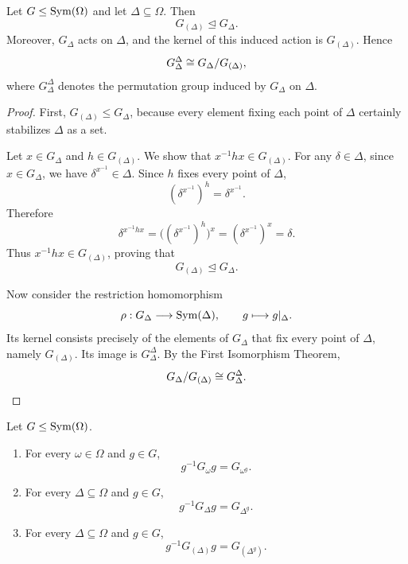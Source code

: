 \begin{proposition}
Let \(G\leq \operatorname{Sym}(\Omega)\) and let \(\Delta\subseteq \Omega\). Then
\[
    G_{(\Delta)}\unlhd G_\Delta.
\]
Moreover, \(G_\Delta\) acts on \(\Delta\), and the kernel of this induced action is \(G_{(\Delta)}\). Hence
\[
    G_\Delta^\Delta \cong G_\Delta/G_{(\Delta)},
\]
where \(G_\Delta^\Delta\) denotes the permutation group induced by \(G_\Delta\) on \(\Delta\).
\end{proposition}

\begin{proof}
First, \(G_{(\Delta)}\leq G_\Delta\), because every element fixing each point of \(\Delta\) certainly stabilizes \(\Delta\) as a set.

Let \(x\in G_\Delta\) and \(h\in G_{(\Delta)}\). We show that \(x^{-1}hx\in G_{(\Delta)}\). For any \(\delta\in \Delta\), since \(x\in G_\Delta\), we have \(\delta^{x^{-1}}\in \Delta\). Since \(h\) fixes every point of \(\Delta\),
\[
    (\delta^{x^{-1}})^h=\delta^{x^{-1}}.
\]
Therefore
\[
    \delta^{x^{-1}hx}
    =
    \bigl((\delta^{x^{-1}})^h\bigr)^x
    =
    (\delta^{x^{-1}})^x
    =
    \delta.
\]
Thus \(x^{-1}hx\in G_{(\Delta)}\), proving that
\[
    G_{(\Delta)}\unlhd G_\Delta.
\]

Now consider the restriction homomorphism
\[
    \rho:G_\Delta\longrightarrow \operatorname{Sym}(\Delta),
    \qquad
    g\longmapsto g|_\Delta.
\]
Its kernel consists precisely of the elements of \(G_\Delta\) that fix every point of \(\Delta\), namely \(G_{(\Delta)}\). Its image is \(G_\Delta^\Delta\). By the First Isomorphism Theorem,
\[
    G_\Delta/G_{(\Delta)}\cong G_\Delta^\Delta.
\]
\end{proof}

\begin{proposition}
Let \(G\leq \operatorname{Sym}(\Omega)\).

\begin{enumerate}[label=\textup{(\arabic*)}]
    \item For every \(\omega\in\Omega\) and \(g\in G\),
    \[
        g^{-1}G_\omega g=G_{\omega^g}.
    \]

    \item For every \(\Delta\subseteq\Omega\) and \(g\in G\),
    \[
        g^{-1}G_\Delta g=G_{\Delta^g}.
    \]

    \item For every \(\Delta\subseteq\Omega\) and \(g\in G\),
    \[
        g^{-1}G_{(\Delta)}g=G_{(\Delta^g)}.
    \]
\end{enumerate}
\end{proposition}


